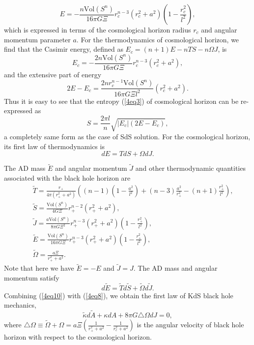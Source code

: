 \documentclass[a4paper,12pt]{article}
\begin{document}
\begin{equation}
\label{4eq4}
 E=- \frac{n\mbox{Vol}(S^n)}{16\pi G \Xi}r_c^{n-3}(r_c^2+a^2)
      \left(1-\frac{r_c^2}{l^2}\right),
\end{equation}
which is expressed in terms of the cosmological horizon radius $r_c$ and angular momentum 
parameter $a$. For the thermodynamics of cosmological horizon, we find that the
Casimir energy, defined as $E_c=(n+1)E-nTS -n\Omega J$, is
\begin{equation}
\label{4eq5} 
E_c=-\frac{2n \mbox{Vol}(S^n)}{16\pi G \Xi}r_c^{n-3}(r_c^2+a^2),
\end{equation}
and the extensive part of energy 
\begin{equation}
2E-E_c=\frac{2n r_c^{n-1}\mbox{Vol}(S^n)}{16\pi G\Xi l^2}(r_c^2+a^2).
\end{equation}
Thus it is easy to see that the entropy (\ref{4eq3}) of cosmological horizon can be re-expressed
as 
\begin{equation}
\label{4eq7}
S=\frac{2\pi l}{n}\sqrt{|E_c|(2E-E_c)},
\end{equation}
a completely same form as the case of SdS solution.  For the cosmological horizon, its first
law of thermodynamics is
\begin{equation}
\label{4eq8}
dE=TdS +\Omega dJ.
\end{equation}

 The AD mass $\tilde E$ and angular momentum $\tilde J$ and other thermodynamic quantities 
associated with the black hole horizon are
\begin{eqnarray}
&& \tilde T= \frac{r_+}{4\pi(r_+^2+a^2)}\left( (n-1)\left(1-\frac{a^2}{l^2}\right) 
            +(n-3)\frac{a^2}{r_+^2} -(n+1)\frac{r_+^2}{l^2}\right),
           \nonumber \\
&& \tilde S =\frac{\mbox{Vol}(S^n)}{4G\Xi}r_+^{n-2}(r_+^2+a^2), \nonumber\\
&& \tilde J = \frac{a\mbox{Vol}(S^n)}{8\pi G\Xi^2}r_+^{n-3}(r_+^2+a^2)
            \left(1-\frac{r_+^2}{l^2}\right), \nonumber \\
&& \tilde E = \frac{\mbox{Vol}(S^n)}{16\pi G\Xi}r_+^{n-3}(r_+^2+a^2)
            \left(1-\frac{r_+^2}{l^2}\right), \nonumber \\
&&\tilde\Omega = \frac{a\Xi}{r_+^2+a^2}.
\end{eqnarray}
Note that here we have  $\tilde E =-E$ and $\tilde J=J$. The AD mass and angular momentum
satisfy 
\begin{equation}
\label{4eq10}
d\tilde E = \tilde Td\tilde S + \tilde \Omega d\tilde J.
\end{equation}
Combining (\ref{4eq10}) with (\ref{4eq8}), we obtain the first law of KdS black hole mechanics,
\begin{equation}
\label{4eq11}
\tilde \kappa d\tilde A +\kappa dA +8\pi G \triangle \Omega dJ=0,
\end{equation}
where $\triangle \Omega \equiv \tilde \Omega +\Omega= a \Xi\left(\frac{1}{r_+^2+a^2}
 -\frac{1}{r_c^2+a^2}\right)$ is the angular velocity of black hole horizon with respect to
the cosmological horizon.  
 
\end{document}
